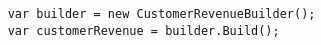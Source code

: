 \begin{verbatim}
    var builder = new CustomerRevenueBuilder();
    var customerRevenue = builder.Build();
\end{verbatim}